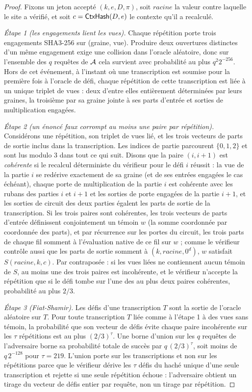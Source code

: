\documentclass[11pt]{article}
\theoremstyle{definition}
\begin{document}
\begin{proof}
Fixons un jeton accepté $(k, e, D, \pi)$, soit $\mathit{racine}$ la valeur contre
laquelle le site a vérifié, et soit $c = \mathsf{CtxHash}(D, e)$ le contexte qu'il a recalculé.

\emph{Étape 1 (les engagements lient les vues).} Chaque répétition porte trois engagements
SHA3-256 sur (graine, vue). Produire deux ouvertures distinctes d'un même engagement exige
une collision dans l'oracle aléatoire, donc sur l'ensemble des $q$ requêtes de
$\mathcal{A}$ cela survient avec probabilité au plus $q^2 2^{-256}$. Hors de cet
événement, à l'instant où une transcription est soumise pour la première fois à l'oracle
de défi, chaque répétition de cette transcription est liée à un unique triplet de vues :
deux d'entre elles entièrement déterminées par leurs graines, la troisième par sa graine
jointe à ses parts d'entrée et sorties de multiplication engagées.

\emph{Étape 2 (un énoncé faux corrompt au moins une paire par répétition).} Considérons
une répétition, son triplet de vues lié, et les trois vecteurs de parts de sortie inclus
dans la transcription. Les indices de partie parcourent $\{0,1,2\}$ et sont lus modulo 3
dans tout ce qui suit. Disons que la paire $(i, i{+}1)$ est \emph{cohérente} si le
recalcul déterministe du vérifieur pour le défi $i$ réussit : la vue de la partie $i$ se
redérive exactement de sa graine (et de ses entrées engagées le cas échéant), chaque porte
de multiplication de la partie $i$ est cohérente avec les rubans des parties $i$ et
$i{+}1$ et les sorties de porte engagées de la partie $i{+}1$, et les sorties de circuit
des deux parties égalent les parts de sortie de la transcription. Si les trois paires sont
cohérentes, les trois vecteurs de parts d'entrée définissent conjointement un témoin $w$
(la somme coordonnée par coordonnée des parts), et par récurrence sur les portes du
circuit, les trois parts de chaque fil somment à l'évaluation native de ce fil sur $w$ ;
comme le vérifieur contrôle aussi que les parts de sortie somment à $(k, \mathit{racine},
0^d)$, $w$ satisfait $S(\mathit{racine}, k, c)$. Par contraposée : si les vues liées ne
contiennent aucun témoin de $S$, au moins une des trois paires est incohérente, et le
vérifieur n'accepte la répétition que si le défi tombe sur l'une des au plus deux paires
cohérentes, probabilité au plus $2/3$.

\emph{Étape 3 (Fiat-Shamir).} Les défis d'une transcription $T$ sont la sortie de l'oracle
aléatoire sur $T$. Pour toute transcription $T$ liée comme à l'étape 1 à des vues sans
témoin, la probabilité que son vecteur de défis évite chaque paire incohérente sur les
$\tau$ répétitions est au plus $(2/3)^\tau$. Une borne d'union sur les $q$ requêtes de
l'adversaire borne sa probabilité totale de succès par $q\,(2/3)^\tau$, soit moins de
$q\,2^{-128}$ pour $\tau = 219$. L'union porte sur les transcriptions et non sur les
répétitions parce que le vérifieur dérive les $\tau$ défis du haché unique d'une seule
transcription et rejette si une seule répétition échoue : l'adversaire obtient un tirage
du vecteur de défis entier par requête, non un tirage par répétition.


\end{proof}
\end{document}
